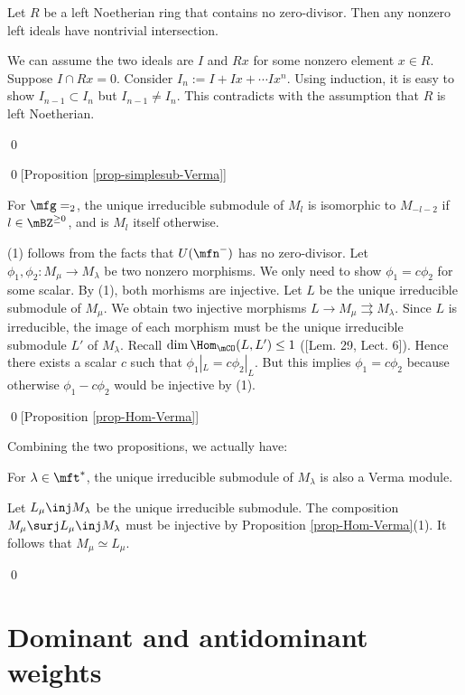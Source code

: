 	\begin{lem}
		Let $R$ be a left Noetherian ring that contains no zero-divisor. Then any nonzero left ideals have nontrivial intersection.
	\end{lem}
	
	\proof
		We can assume the two ideals are $I$ and $Rx$ for some nonzero element $x\in R$. Suppose $I\cap Rx =0$. Consider $I_n:= I + Ix +\cdots Ix^n$. Using induction, it is easy to show $I_{n-1}\subset I_n$ but $I_{n-1}\neq I_n$. This contradicts with the assumption that $R$ is left Noetherian.

	\qed

\qed[Proposition \ref{prop-simplesub-Verma}]

\begin{exam}
	For $\mfg=\sl_2$, the unique irreducible submodule of $M_l$ is isomorphic to $M_{-l-2}$ if $l\in \mBZ^{\ge 0}$, and is $M_l$ itself otherwise.
\end{exam}

	(1) follows from the facts that $U(\mfn^-)$ has no zero-divisor. Let $\phi_1,\phi_2:M_\mu \to M_\lambda$ be two nonzero morphisms. We only need to show $\phi_1 = c\phi_2$ for some scalar. By (1), both morhisms are injective. Let $L$ be the unique irreducible submodule of $M_\mu$. We obtain two injective morphisms $L \to M_\mu \rightrightarrows M_\lambda$. Since $L$ is irreducible, the image of each morphism must be the unique irreducible submodule $L'$ of $M_\lambda$. Recall $\dim \Hom_\mCO(L,L')\le 1$ ([Lem. 29, Lect. 6]). Hence there exists a scalar $c$ such that $\phi_1|_L = c\phi_2|_L$. But this implies $\phi_1 = c\phi_2$ because otherwise $\phi_1 - c\phi_2$ would be injective by (1).

\qed[Proposition \ref{prop-Hom-Verma}]

Combining the two propositions, we actually have:

\begin{cor}
	For $\lambda \in \mft^*$, the unique irreducible submodule of $M_\lambda$ is also a Verma module.
\end{cor}

\proof
	Let $L_\mu \inj M_\lambda$ be the unique irreducible submodule. The composition $M_\mu \surj L_\mu \inj M_\lambda$ must be injective by Proposition \ref{prop-Hom-Verma}(1). It follows that $M_\mu\simeq L_\mu$.

\qed



\section{Dominant and antidominant weights}

